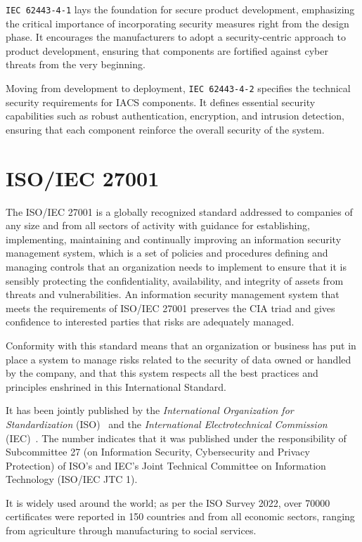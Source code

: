 \texttt{IEC 62443-4-1} lays the foundation for secure product development, emphasizing the critical importance of incorporating security measures right from the design phase. It encourages the manufacturers to adopt a security-centric approach to product development, ensuring that components are fortified against cyber threats from the very beginning.

Moving from development to deployment, \texttt{IEC 62443-4-2} specifies the technical security requirements for IACS components. It defines essential security capabilities such as robust authentication, encryption, and intrusion detection, ensuring that each component reinforce the overall security of the system.~\cite{iec-62443-safeguarding-industrial-automation-linkedin}


\section{ISO/IEC 27001}

The ISO/IEC 27001 is a globally recognized standard addressed to companies of any size and from all sectors of activity with guidance for establishing, implementing, maintaining and continually improving an information security management system, which is a set of policies and procedures defining and managing controls that an organization needs to implement to ensure that it is sensibly protecting the confidentiality, availability, and integrity of assets from threats and vulnerabilities. An information security management system that meets the requirements of ISO/IEC 27001 preserves the CIA triad and gives confidence to interested parties that risks are adequately managed.

Conformity with this standard means that an organization or business has put in place a system to manage risks related to the security of data owned or handled by the company, and that this system respects all the best practices and principles enshrined in this International Standard.

It has been jointly published by the \textit{International Organization for Standardization} (ISO)~\cite{iso} and the \textit{International Electrotechnical Commission} (IEC)~\cite{iec}. The number indicates that it was published under the responsibility of Subcommittee 27 (on Information Security, Cybersecurity and Privacy Protection) of ISO's and IEC's Joint Technical Committee on Information Technology (ISO/IEC JTC 1).

It is widely used around the world; as per the ISO Survey 2022, over 70000 certificates were reported in 150 countries and from all economic sectors, ranging from agriculture through manufacturing to social services.~\cite{iso-27001}

